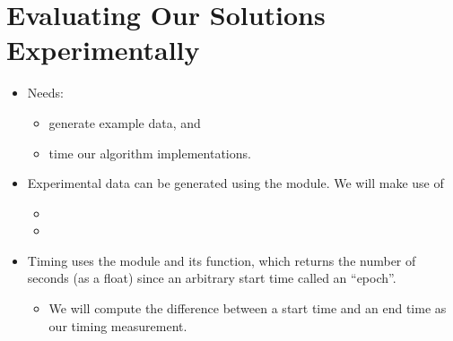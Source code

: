 \documentclass[letterpaper,10pt,english]{sphinxmanual}
\begin{document}
\section{Evaluating Our Solutions Experimentally}
\label{\detokenize{lecture_notes/lec20_searching:evaluating-our-solutions-experimentally}}\begin{itemize}
\item {} 
Needs:
\begin{itemize}
\item {} 
generate example data, and

\item {} 
time our algorithm implementations.

\end{itemize}

\item {} 
Experimental data can be generated using the  module. We
will make use of
\begin{itemize}
\item {} 

\item {} 

\end{itemize}

\item {} 
Timing uses the  module and its  function, which
returns the number of seconds (as a float) since an arbitrary start
time called an “epoch”.
\begin{itemize}
\item {} 
We will compute the difference between a start time and an end
time as our timing measurement.

\end{itemize}

\end{itemize}
\end{document}
